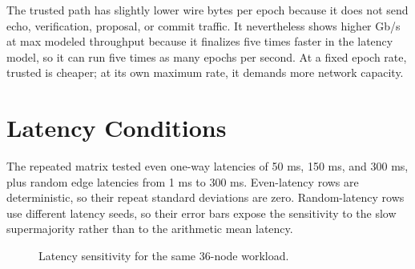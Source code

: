\documentclass[11pt]{article}
\begin{document}
\begin{table}[h]
\centering
\caption{Core throughput at 150 ms one-way latency.}
\end{table}

The trusted path has slightly lower wire bytes per epoch because it does not
send echo, verification, proposal, or commit traffic. It nevertheless shows
higher Gb/s at max modeled throughput because it finalizes five times faster in
the latency model, so it can run five times as many epochs per second. At a
fixed epoch rate, trusted is cheaper; at its own maximum rate, it demands more
network capacity.

\section{Latency Conditions}

The repeated matrix tested even one-way latencies of 50 ms, 150 ms, and 300 ms,
plus random edge latencies from 1 ms to 300 ms. Even-latency rows are
deterministic, so their repeat standard deviations are zero. Random-latency
rows use different latency seeds, so their error bars expose the sensitivity to
the slow supermajority rather than to the arithmetic mean latency.

\begin{figure}[h]
\centering
{}
\caption{Latency sensitivity for the same 36-node workload.}
\end{figure}
\end{document}
